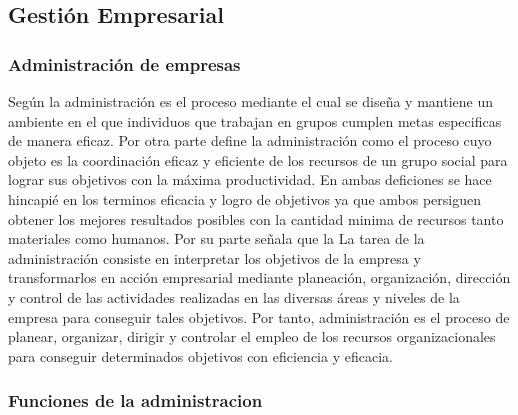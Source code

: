 \subsection{Gesti\'on Empresarial}
\subsubsection{Administraci\'on de empresas}
Seg\'un \cite{koontz} la administraci\'on es el proceso mediante el cual se dise\~na
y mantiene un ambiente en el que individuos que trabajan en grupos cumplen metas
especificas de manera eficaz. Por otra parte \citep{galindo} define la administraci\'on
como el proceso cuyo objeto es la coordinaci\'on eficaz y eficiente de los recursos
de un grupo social para lograr sus objetivos con la m\'axima productividad.
En ambas deficiones se hace hincapi\'e en los terminos eficacia y logro de objetivos
ya que ambos persiguen obtener los mejores resultados posibles con la cantidad
minima de recursos tanto materiales como humanos. Por su parte \citep{chiavenato}
se\~nala que la La tarea de la administraci\'on consiste en interpretar los objetivos
de la empresa y transformarlos en acci\'on empresarial mediante planeaci\'on, organizaci\'on,
direcci\'on y control de las actividades realizadas en las diversas \'areas y niveles
de la empresa para conseguir tales objetivos. Por tanto, administraci\'on es el
proceso de planear, organizar, dirigir y controlar el empleo de los recursos
organizacionales para conseguir determinados objetivos con eficiencia y eficacia.

\subsubsection{Funciones de la administracion}

